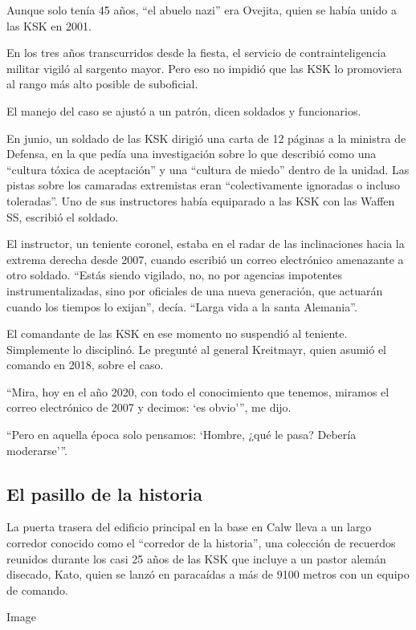 Aunque solo tenía 45 años, ``el abuelo nazi'' era Ovejita, quien se
había unido a las KSK en 2001.

En los tres años transcurridos desde la fiesta, el servicio de
contrainteligencia militar vigiló al sargento mayor. Pero eso no impidió
que las KSK lo promoviera al rango más alto posible de suboficial.

El manejo del caso se ajustó a un patrón, dicen soldados y funcionarios.

En junio, un soldado de las KSK dirigió una carta de 12 páginas a la
ministra de Defensa, en la que pedía una investigación sobre lo que
describió como una ``cultura tóxica de aceptación'' y una ``cultura de
miedo'' dentro de la unidad. Las pistas sobre los camaradas extremistas
eran ``colectivamente ignoradas o incluso toleradas''. Uno de sus
instructores había equiparado a las KSK con las Waffen SS, escribió el
soldado.

El instructor, un teniente coronel, estaba en el radar de las
inclinaciones hacia la extrema derecha desde 2007, cuando escribió un
correo electrónico amenazante a otro soldado. ``Estás siendo vigilado,
no, no por agencias impotentes instrumentalizadas, sino por oficiales de
una nueva generación, que actuarán cuando los tiempos lo exijan'',
decía. ``Larga vida a la santa Alemania''.

El comandante de las KSK en ese momento no suspendió al teniente.
Simplemente lo disciplinó. Le pregunté al general Kreitmayr, quien
asumió el comando en 2018, sobre el caso.

``Mira, hoy en el año 2020, con todo el conocimiento que tenemos,
miramos el correo electrónico de 2007 y decimos: `es obvio''', me dijo.

``Pero en aquella época solo pensamos: `Hombre, ¿qué le pasa? Debería
moderarse'''.

\hypertarget{el-pasillo-de-la-historia}{%
\subsection{El pasillo de la historia}\label{el-pasillo-de-la-historia}}

La puerta trasera del edificio principal en la base en Calw lleva a un
largo corredor conocido como el ``corredor de la historia'', una
colección de recuerdos reunidos durante los casi 25 años de las KSK que
incluye a un pastor alemán disecado, Kato, quien se lanzó en paracaídas
a más de 9100 metros con un equipo de comando.

Image

